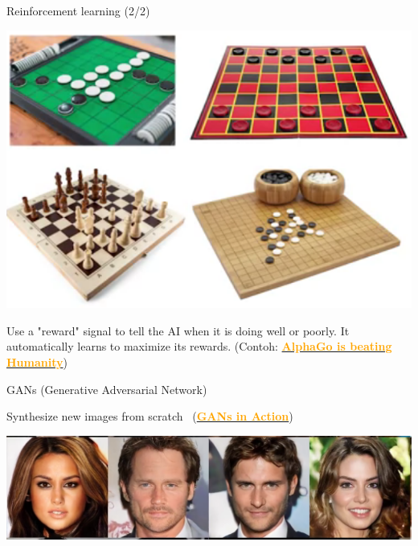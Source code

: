 \documentclass[pdf]{beamer}
\theoremstyle{mystyle}
\begin{document}
\begin{frame}{Reinforcement learning (2/2)}
	\begin{center}
		\includegraphics[scale=.325]{reinforcement-learning-2}
	\end{center}
	Use a "reward" signal to tell the AI when it is doing well or poorly. It automatically learns to maximize its rewards.
	(Contoh: \href{https://drive.google.com/file/d/1Bia4pGf2m1lg9Fd8Suu732Hz471nUg6j/view?usp=sharing}{\textcolor {orange} {\textbf{AlphaGo is beating Humanity}}})
\end{frame}


\begin{frame}{GANs (Generative Adversarial Network)}
	\begin{center}
		Synthesize new images from scratch~\citep{karras2017progressive} (\href{https://drive.google.com/file/d/12kyeMlwG7geHo3WzO9wOo00n53LBOvpj/view?usp=sharing}{\textcolor{orange}{\textbf{GANs in Action}}})
	\end{center}
	\begin{center}
		\includegraphics[scale=.25]{GANs}
	\end{center}
			
\end{frame}
\end{document}
